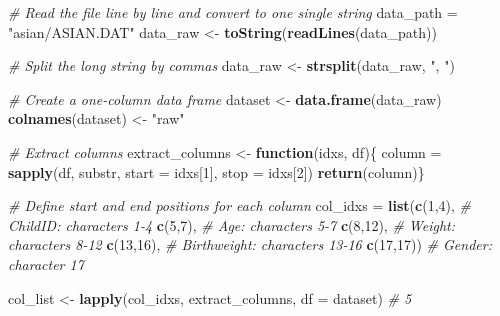 \documentclass[
  12pt,
]{article}
\newenvironment{Shaded}{\begin{snugshade}}{\end{snugshade}}
\newcommand{\AttributeTok}[1]{\textcolor[rgb]{0.13,0.29,0.53}{#1}}
\newcommand{\CommentTok}[1]{\textcolor[rgb]{0.56,0.35,0.01}{\textit{#1}}}
\newcommand{\ControlFlowTok}[1]{\textcolor[rgb]{0.13,0.29,0.53}{\textbf{#1}}}
\newcommand{\DecValTok}[1]{\textcolor[rgb]{0.00,0.00,0.81}{#1}}
\newcommand{\FunctionTok}[1]{\textcolor[rgb]{0.13,0.29,0.53}{\textbf{#1}}}
\newcommand{\NormalTok}[1]{#1}
\newcommand{\OtherTok}[1]{\textcolor[rgb]{0.56,0.35,0.01}{#1}}
\newcommand{\StringTok}[1]{\textcolor[rgb]{0.31,0.60,0.02}{#1}}
\begin{document}
\begin{Shaded}
\begin{Highlighting}[]
  \CommentTok{\# Read the file line by line and convert to one single string}
\NormalTok{  data\_path }\OtherTok{=} \StringTok{"asian/ASIAN.DAT"}
\NormalTok{  data\_raw }\OtherTok{\textless{}{-}} \FunctionTok{toString}\NormalTok{(}\FunctionTok{readLines}\NormalTok{(data\_path))}

  \CommentTok{\# Split the long string by commas}
\NormalTok{  data\_raw }\OtherTok{\textless{}{-}} \FunctionTok{strsplit}\NormalTok{(data\_raw, }\StringTok{", "}\NormalTok{)}

  \CommentTok{\# Create a one{-}column data frame}
\NormalTok{  dataset }\OtherTok{\textless{}{-}} \FunctionTok{data.frame}\NormalTok{(data\_raw)}
  \FunctionTok{colnames}\NormalTok{(dataset) }\OtherTok{\textless{}{-}} \StringTok{"raw"}

  \CommentTok{\# Extract columns}
\NormalTok{  extract\_columns }\OtherTok{\textless{}{-}} \ControlFlowTok{function}\NormalTok{(idxs, df)\{}
\NormalTok{      column }\OtherTok{=} \FunctionTok{sapply}\NormalTok{(df, substr, }\AttributeTok{start =}\NormalTok{ idxs[}\DecValTok{1}\NormalTok{], }\AttributeTok{stop =}\NormalTok{ idxs[}\DecValTok{2}\NormalTok{])}
      \FunctionTok{return}\NormalTok{(column)\}}

  \CommentTok{\# Define start and end positions for each column}
\NormalTok{  col\_idxs }\OtherTok{=} \FunctionTok{list}\NormalTok{(}\FunctionTok{c}\NormalTok{(}\DecValTok{1}\NormalTok{,}\DecValTok{4}\NormalTok{), }\CommentTok{\# ChildID: characters 1{-}4}
                  \FunctionTok{c}\NormalTok{(}\DecValTok{5}\NormalTok{,}\DecValTok{7}\NormalTok{), }\CommentTok{\# Age: characters 5{-}7}
                  \FunctionTok{c}\NormalTok{(}\DecValTok{8}\NormalTok{,}\DecValTok{12}\NormalTok{), }\CommentTok{\# Weight: characters 8{-}12}
                  \FunctionTok{c}\NormalTok{(}\DecValTok{13}\NormalTok{,}\DecValTok{16}\NormalTok{), }\CommentTok{\# Birthweight: characters 13{-}16}
                  \FunctionTok{c}\NormalTok{(}\DecValTok{17}\NormalTok{,}\DecValTok{17}\NormalTok{)) }\CommentTok{\# Gender: character 17}

\NormalTok{  col\_list }\OtherTok{\textless{}{-}} \FunctionTok{lapply}\NormalTok{(col\_idxs, extract\_columns, }\AttributeTok{df =}\NormalTok{ dataset) }\CommentTok{\# 5}


\end{Highlighting}
\end{Shaded}
\end{document}
